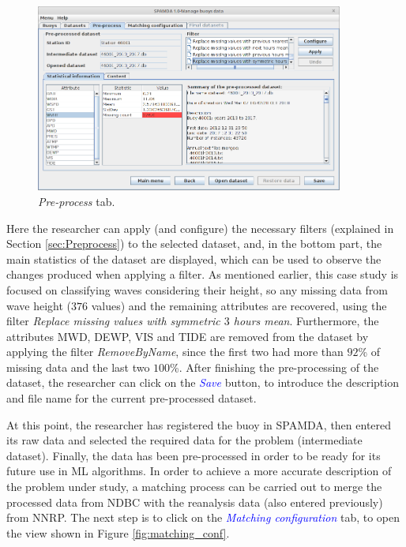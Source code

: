 \documentclass[review]{elsarticle}
\begin{document}
		\begin{figure}[ht!]
			\centering
			\includegraphics[width=0.90\textwidth]{figures/FigurePreprocess.png}
			\caption{\textit{Pre-process} tab.}\label{fig:preprocess_data}
		\end{figure}
		
		Here the researcher can apply (and configure) the necessary filters (explained in Section \ref{sec:Preprocess}) to the selected dataset, and, in the bottom part, the main statistics of the dataset are displayed, which can be used to observe the changes produced when applying a filter. As mentioned earlier, this case study is focused on classifying waves considering their height, so any missing data from wave height ($376$ values) and the remaining attributes are recovered, using the filter \textit{Replace missing values with symmetric $3$ hours mean}. Furthermore, the attributes MWD, DEWP, VIS and TIDE are removed from the dataset by applying the filter \textit{RemoveByName}, since the first two had more than $92$\% of missing data and the last two $100$\%. After finishing the pre-processing of the dataset, the researcher can click on the \textcolor{blue}{\textit{Save}} button, to introduce the description and file name for the current pre-processed dataset.
		
		At this point, the researcher has registered the buoy in SPAMDA, then entered its raw data and selected the required data for the problem (intermediate dataset). Finally, the data has been pre-processed in order to be ready for its future use in ML algorithms. In order to achieve a more accurate description of the problem under study, a matching process can be carried out to merge the processed data from NDBC with the reanalysis data (also entered previously) from NNRP. The next step is to click on the \textcolor{blue}{\textit{Matching configuration}} tab, to open the view shown in  Figure \ref{fig:matching_conf}. 
		
\end{document}
